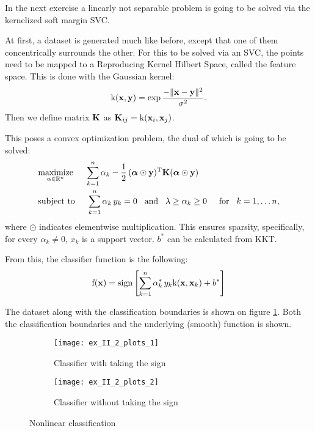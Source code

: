 In the next exercise a linearly not separable problem is going to be solved
via the kernelized soft margin SVC.

At first, a dataset is generated much like before, except that one of them concentrically
surrounds the other. For this to be solved via an SVC, the points need to be mapped
to a Reproducing Kernel Hilbert Space, called the feature space.
This is done with the Gaussian kernel:
\begin{equation}
	\mathrm{k}(\boldsymbol{\mathrm{x}}, \boldsymbol{\mathrm{y}}) = \exp\frac{-\lVert\boldsymbol{\mathrm{x}}-\boldsymbol{\mathrm{y}}\rVert^2}{\sigma^2}.
\end{equation}
Then we define matrix $\boldsymbol{\mathrm{K}}$ as $\boldsymbol{\mathrm{K}}_{ij} = \mathrm{k}(\boldsymbol{\mathrm{x}}_i, \boldsymbol{\mathrm{x}}_j)$.

This poses a convex optimization problem, the dual of which is going to be solved:
\begin{equation}
\begin{split}
	&\underset{\alpha\in\mathbb{R}^n}{\operatorname{maximize}}\hspace{5mm}
		\sum\limits_{k=1}^n\alpha_k - \frac{1}{2}\,(\boldsymbol{\mathrm{\alpha}}\odot\boldsymbol{\mathrm{y}})\textsuperscript{T}\boldsymbol{\mathrm{K}}(\boldsymbol{\mathrm{\alpha}}\odot\boldsymbol{\mathrm{y}})\\
	&\text{subject to}\hspace{5mm}
		\sum\limits_{k=1}^n\alpha_k\,y_k=0\hspace{3mm}\text{and}\hspace{3mm}\lambda\geq\alpha_k\geq0\hspace{5mm}\text{for}\hspace{3mm} k=1,\dots n,
\end{split}
\end{equation}
where $\odot$ indicates elementwise multiplication.
This ensures sparsity, specifically, for every $\alpha_k\neq0$, $x_k$ is a support vector.
$b^*$ can be calculated from KKT.

From this, the classifier function is the following:
\begin{equation}
	\mathrm{f}(\boldsymbol{\mathrm{x}}) = \operatorname{sign}\left[\sum\limits_{k=1}^n\alpha_k^*\,y_k\mathrm{k}(\boldsymbol{\mathrm{x}}, \boldsymbol{\mathrm{x}}_k) + b^*\right]
\end{equation}

The dataset along with the classification boundaries is shown on figure \ref{fig:kernel-SVC}.
Both the classification boundaries and the underlying (smooth) function is shown.

\begin{figure}[H]
	\centering
	\begin{subfigure}{.49\textwidth}
		\centering
		\texttt{[image: ex\_II\_2\_plots\_1]}
		\caption{Classifier with taking the sign}
	\end{subfigure}
	\begin{subfigure}{.49\textwidth}
		\centering
		\texttt{[image: ex\_II\_2\_plots\_2]}
		\caption{Classifier without taking the sign}
	\end{subfigure}
	\caption{Nonlinear classification}
	\label{fig:kernel-SVC}
\end{figure}

